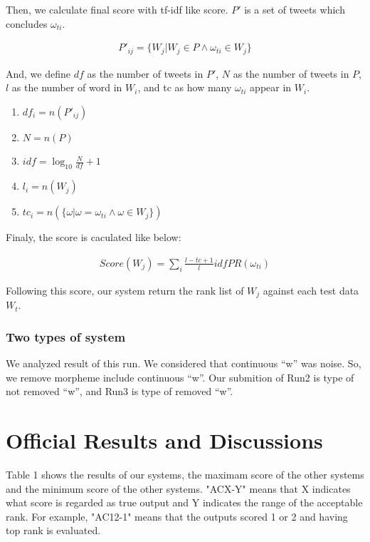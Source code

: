 \documentclass{../style/sig-alternate}
\begin{document}
Then, we calculate final score with tf-idf like score. $P'$ is a set of tweets which concludes $\omega_{ti}$. 

\begin{eqnarray}P'_{ij} = \{W_{j} | W_{j} \in P \wedge \omega_{ti} \in W_{j}\}\end{eqnarray}

And, we define $df$ as the number of tweets in $P'$, $N$ as the number of tweets in $P$, $l$ as the number of word in $W_{i}$, and tc as how many $\omega_{ti}$ appear in $W_{i}$.

\begin{enumerate}
    \item $df_{i} = n(P'_{ij})$
    \item $N = n(P)$
    \item $idf = \log_{10} \frac{N}{df} + 1$
    \item $l_{i} = n(W_{j})$
    \item $tc_{i} = n(\{\omega | \omega = \omega_{ti} \wedge \omega \in W_{j}\})$
\end{enumerate}

Finaly, the score is caculated like below:

\begin{eqnarray}Score(W_{j}) = \sum_{i} \frac{l-tc+1}{l} idf PR(\omega_{ti})\end{eqnarray}

Following this score, our system return the rank list of $W_{j}$ against each test data $W_{t}$.

\subsubsection{Two types of system}

  We analyzed result of this run. We considered that continuous ``w'' was noise. So, we remove morpheme include continuous ``w''.
  Our submition of Run2 is type of not removed ``w'', and Run3 is type of removed ``w''.



\section{Official Results and Discussions}
\label{sec:results}
Table 1 shows the results of our systems, the maximam score of the other systems and the minimum score of the other systems. 
"ACX-Y" means that X indicates what score is regarded as true output and Y indicates the range of the acceptable rank. For example, "AC12-1" means that the outputs scored 1 or 2 and having top rank is evaluated.
\end{document}
